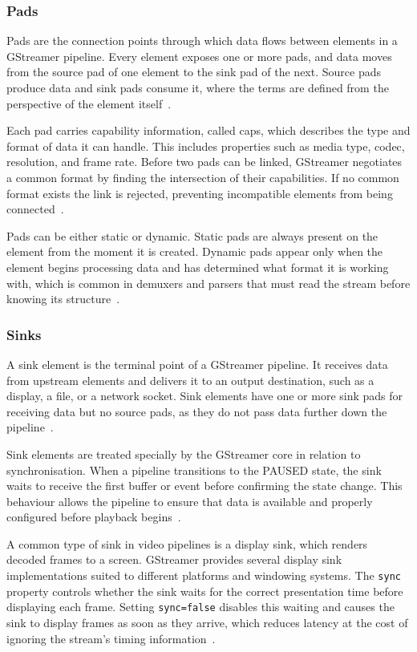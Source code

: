 \subsubsection{Pads}\label{subsec:pads}
Pads are the connection points through which data flows between elements in a GStreamer pipeline. Every element exposes one or more pads, and data moves from the source pad of one element to the sink pad of the next. Source pads produce data and sink pads consume it, where the terms are defined from the perspective of the element itself~\cite{gstreamer_pads}.
 
Each pad carries capability information, called caps, which describes the type and format of data it can handle. This includes properties such as media type, codec, resolution, and frame rate. Before two pads can be linked, GStreamer negotiates a common format by finding the intersection of their capabilities. If no common format exists the link is rejected, preventing incompatible elements from being connected~\cite{gstreamer_pads}.
 
Pads can be either static or dynamic. Static pads are always present on the element from the moment it is created. Dynamic pads appear only when the element begins processing data and has determined what format it is working with, which is common in demuxers and parsers that must read the stream before knowing its structure~\cite{gstreamer_pads}.

\subsubsection{Sinks}\label{subsec:sinks}
A sink element is the terminal point of a GStreamer pipeline. It receives data from upstream elements and delivers it to an output destination, such as a display, a file, or a network socket. Sink elements have one or more sink pads for receiving data but no source pads, as they do not pass data further down the pipeline~\cite{gstreamer_sink}.
 
Sink elements are treated specially by the GStreamer core in relation to synchronisation. When a pipeline transitions to the PAUSED state, the sink waits to receive the first buffer or event before confirming the state change. This behaviour allows the pipeline to ensure that data is available and properly configured before playback begins~\cite{gstreamer_sink}.
 
A common type of sink in video pipelines is a display sink, which renders decoded frames to a screen. GStreamer provides several display sink implementations suited to different platforms and windowing systems. The \texttt{sync} property controls whether the sink waits for the correct presentation time before displaying each frame. Setting \texttt{sync=false} disables this waiting and causes the sink to display frames as soon as they arrive, which reduces latency at the cost of ignoring the stream's timing information~\cite{gstreamer_sink}.

